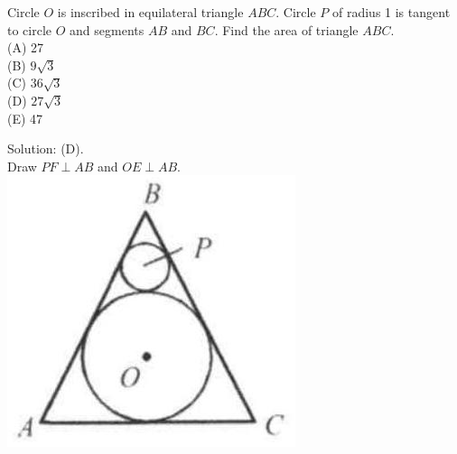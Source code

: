 \documentclass{article}
\begin{document}
Circle \(O\) is inscribed in equilateral triangle \(A B C\). Circle \(P\) of radius 1 is tangent to circle \(O\) and segments \(A B\) and \(B C\). Find the area of triangle \(A B C\).\\
(A) 27\\
(B) \(9 \sqrt{3}\)\\
(C) \(36 \sqrt{3}\)\\
(D) \(27 \sqrt{3}\)\\
(E) 47

Solution: (D).\\
Draw \(P F \perp A B\) and \(O E \perp A B\).\\
\centering
\includegraphics[width=\textwidth]{images/176.jpg}
\end{document}
